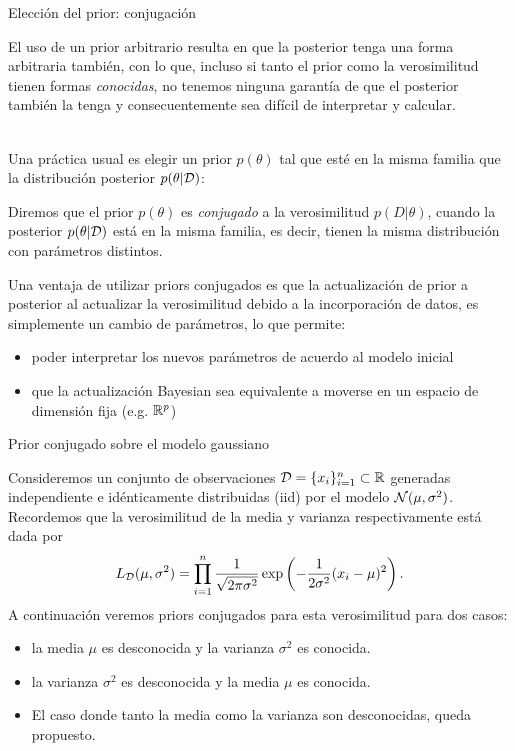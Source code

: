 \documentclass[9pt, handout]{beamer}
\begin{document}
\begin{frame}{Elección del prior: conjugación}
	
El uso de un prior arbitrario resulta en que la posterior tenga una forma arbitraria también, con lo que, incluso si tanto el prior como la verosimilitud tienen formas \emph{conocidas}, no tenemos ninguna garantía de que el posterior también la tenga y consecuentemente sea difícil de interpretar y calcular.\\~\ \pause

 Una práctica usual es elegir un prior $p(\theta)$ tal que esté en la misma familia que la distribución posterior $p(\theta|{\mathcal D})$:

\begin{definition}
	Diremos que el prior $p(\theta)$ es \emph{conjugado} a la verosimilitud $p(D|\theta)$, cuando la posterior $p(\theta|{\mathcal D})$ está en la misma familia, es decir, tienen la misma distribución con parámetros distintos.   
\end{definition}\pause

Una ventaja de utilizar priors conjugados es que la actualización de prior a posterior al actualizar la verosimilitud debido a la incorporación de datos, es simplemente un cambio de parámetros, lo que permite:
\begin{itemize}
		\item poder interpretar los nuevos parámetros de acuerdo al modelo inicial
		\item que la actualización Bayesian sea equivalente a moverse en un espacio de dimensión fija (e.g. $\mathbb{R}^p$)
\end{itemize} 

\end{frame}

\begin{frame}{Prior conjugado sobre el modelo gaussiano}

Consideremos un conjunto de observaciones ${\mathcal D}=\{x_i\}_{i=1}^n\subset\mathbb{R}$ generadas independiente e idénticamente distribuidas (iid) por el modelo ${\mathcal N}(\mu,\sigma^2)$. Recordemos que la verosimilitud de la media y varianza respectivamente está dada por 
\begin{equation}
	L_{\mathcal D}(\mu, \sigma^2) = \prod_{i=1}^n \frac{1}{\sqrt{2\pi\sigma^2}}\exp\left(-\frac{1}{2\sigma^2}(x_i-\mu)^2\right).
 \end{equation}
\pause
A continuación veremos priors conjugados para esta verosimilitud para dos casos:

\begin{itemize}
	\item la media $\mu$ es desconocida y la varianza $\sigma^2$ es conocida.
	\item la varianza $\sigma^2$ es desconocida y la media $\mu$ es conocida.
	\item El caso donde tanto la media como la varianza son desconocidas, queda propuesto.
\end{itemize}

\end{frame}
\end{document}
